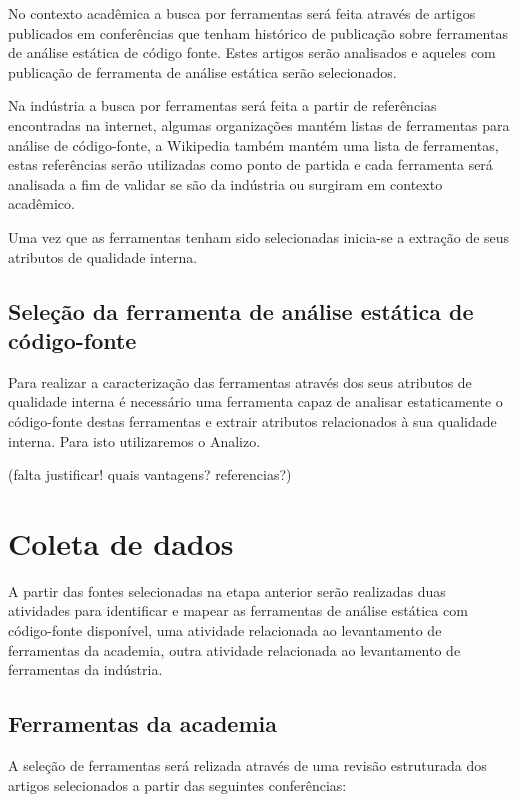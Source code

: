 \documentclass[qual, classic, a4paper]{ufbathesis}
\begin{document}
No contexto acadêmica a busca por ferramentas será feita
através de artigos publicados em conferências que tenham histórico de
publicação sobre ferramentas de análise estática de código fonte. Estes
artigos serão analisados e aqueles com publicação de ferramenta de análise
estática serão selecionados.

Na indústria a busca por ferramentas será feita a partir
de referências encontradas na internet, algumas organizações mantém listas de
ferramentas para análise de código-fonte, a Wikipedia também mantém uma lista
de ferramentas, estas referências serão utilizadas como ponto de partida e
cada ferramenta será analisada a fim de validar se são da indústria ou
surgiram em contexto acadêmico.

Uma vez que as ferramentas tenham sido selecionadas inicia-se a extração de
seus atributos de qualidade interna.

\subsection{Seleção da ferramenta de análise estática de código-fonte}

Para realizar a caracterização das ferramentas através dos seus atributos de
qualidade interna é necessário uma ferramenta capaz de analisar estaticamente
o código-fonte destas ferramentas e extrair atributos relacionados à sua
qualidade interna. Para isto utilizaremos o Analizo\cite{Terceiro2010}.

(falta justificar! quais vantagens? referencias?)

\section{Coleta de dados}

A partir das fontes selecionadas na etapa anterior serão realizadas duas
atividades para identificar e mapear as ferramentas de análise estática com
código-fonte disponível, uma atividade relacionada ao levantamento de
ferramentas da academia, outra atividade relacionada ao levantamento de
ferramentas da indústria.

\subsection{Ferramentas da academia}

A seleção de ferramentas será relizada através de uma revisão estruturada dos
artigos selecionados a partir das seguintes conferências:
\end{document}
